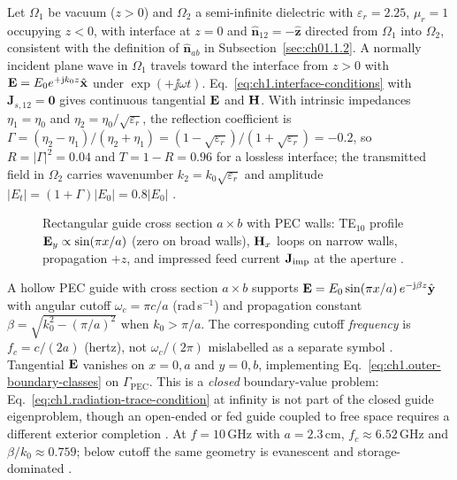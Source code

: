 \label{prop:ch1.source-boundary-compatibility}
\begin{example}
\label{ex:ch1.dielectric-interface}
Let $\Omega_1$ be vacuum ($z>0$) and $\Omega_2$ a semi-infinite dielectric with $\varepsilon_r=2.25$, $\mu_r=1$ occupying $z<0$, with interface at $z=0$ and $\hat{\mathbf{n}}_{12}=-\hat{\mathbf{z}}$ directed from $\Omega_1$ into $\Omega_2$, consistent with the definition of $\hat{\mathbf{n}}_{ab}$ in Subsection~\ref{sec:ch01.1.2}. A normally incident plane wave in $\Omega_1$ travels toward the interface from $z>0$ with $\mathbf{E}=E_0 e^{+\mathrm{j} k_0 z}\hat{\mathbf{x}}$ under $\exp(+\jj\omega t)$. Eq.~\eqref{eq:ch1.interface-conditions} with $\mathbf{J}_{s,12}=\mathbf{0}$ gives continuous tangential $\mathbf{E}$ and $\mathbf{H}$. With intrinsic impedances $\eta_1=\eta_0$ and $\eta_2=\eta_0/\sqrt{\varepsilon_r}$, the reflection coefficient is $\Gamma=(\eta_2-\eta_1)/(\eta_2+\eta_1)=(1-\sqrt{\varepsilon_r})/(1+\sqrt{\varepsilon_r})=-0.2$, so $R=|\Gamma|^2=0.04$ and $T=1-R=0.96$ for a lossless interface; the transmitted field in $\Omega_2$ carries wavenumber $k_2=k_0\sqrt{\varepsilon_r}$ and amplitude $|E_t|=(1+\Gamma)|E_0|=0.8|E_0|$ \cite{stratton1941,jackson1999}.
\end{example}

\begin{figure}[t]
\centering
{}
\caption{Rectangular guide cross section $a\times b$ with PEC walls: TE$_{10}$ profile $\mathbf{E}_y\propto\sin(\pi x/a)$ (zero on broad walls), $\mathbf{H}_x$ loops on narrow walls, propagation $+z$, and impressed feed current $\mathbf{J}_{\mathrm{imp}}$ at the aperture \cite{stratton1941,collin2001}.}
\label{fig:ch1.wp-te10-waveguide}
\end{figure}
\begin{example}
\label{ex:ch1.te10-waveguide}
A hollow PEC guide with cross section $a\times b$ supports $\mathbf{E}=E_0\sin(\pi x/a)\,e^{-\mathrm{j}\beta z}\hat{\mathbf{y}}$ with angular cutoff $\omega_c=\pi c/a$ (rad\,s$^{-1}$) and propagation constant $\beta=\sqrt{k_0^2-(\pi/a)^2}$ when $k_0>\pi/a$. The corresponding cutoff \emph{frequency} is $f_c=c/(2a)$ (hertz), not $\omega_c/(2\pi)$ mislabelled as a separate symbol \cite{stratton1941,collin2001}. Tangential $\mathbf{E}$ vanishes on $x=0,a$ and $y=0,b$, implementing Eq.~\eqref{eq:ch1.outer-boundary-classes} on $\Gamma_{\mathrm{PEC}}$. This is a \emph{closed} boundary-value problem: Eq.~\eqref{eq:ch1.radiation-trace-condition} at infinity is not part of the closed guide eigenproblem, though an open-ended or fed guide coupled to free space requires a different exterior completion \cite{stratton1941,collin2001}. At $f=10\,\mathrm{GHz}$ with $a=2.3\,\mathrm{cm}$, $f_c\approx 6.52\,\mathrm{GHz}$ and $\beta/k_0\approx 0.759$; below cutoff the same geometry is evanescent and storage-dominated \cite{harrington2001}.
\end{example}

